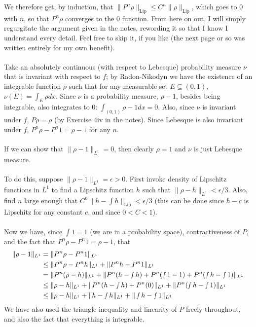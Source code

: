 \documentclass[10pt,a4paper]{article}
\begin{document}
We therefore get, by induction, that $\|P^n\rho\|_{\text{Lip}}\leq C^n\|\rho\|_{\text{Lip}}$, which goes to 0 with $n$, so that $P^n\rho$ converges to the 0 function. From here on out, I will simply regurgitate the argument given in the notes, rewording it so that I know I understand every detail. Feel free to skip it, if you like (the next page or so was written entirely for my own benefit).\\\\
Take an absolutely continuous (with respect to Lebesque) probability measure $\nu$ that is invariant with respect to $f$; by Radon-Nikodyn we have the existence of an integrable function $\rho$ such that for any measurable set $E\subseteq(0,1)$, $\nu(E)=\int_E \rho dx$. Since $\nu$ is a probability measure, $\rho-1$, besides being integrable, also integrates to 0: $\int_{(0,1)}\rho-1dx=0$. Also, since $\nu$ is invariant under $f$, $P\rho=\rho$ (by Exercise 4iv in the notes). Since Lebesque is also invariant under $f$, $P^n\rho-P^n1=\rho-1$ for any $n$.\\\\
If we can show that $\|\rho-1\|_{L^1}=0$, then clearly $\rho=1$ and $\nu$ is just Lebesque measure.\\\\
To do this, suppose $\|\rho-1\|_{L^1}=\epsilon>0$. First invoke density of Lipschitz functions in $L^1$ to find a Lipschitz function $h$ such that $\|\rho-h\|_{L^1}<\epsilon/3$. Also, find $n$ large enough that $C^n\|h-\int h\|_{\text{Lip}}<\epsilon/3$ (this can be done since $h-c$ is Lipschitz for any constant $c$, and since $0<C<1$).\\\\
Now we have, since $\int1=1$ (we are in a probability space), contractiveness of $P$, and the fact that $P^n\rho-P^n1=\rho-1$, that
\begin{align*}\|\rho-1\|_{L^1}&=\|P^n\rho-P^n1\|_{L^1}\\
&\leq\|P^n\rho-P^nh\|_{L^1}+\|P^nh-P^n1\|_{L^1}\\
&=\|P^n(\rho-h)\|_{L^1}+\|P^n(h-\smallint h)+P^n(\smallint 1-1)+P^n(\smallint h-\smallint 1)\|_{L^1}\\
&\leq\|\rho-h\|_{L^1}+\|P^n(h-\smallint h)+P^n(0)\|_{L^1}+\|P^n(\smallint h-\smallint 1)\|_{L^1}\\
&\leq\|\rho-h\|_{L^1}+\|h-\smallint h\|_{L^1}+\|\smallint h-\smallint 1\|_{L^1}
\end{align*}
We have also used the triangle inequality and linearity of $P$ freely throughout, and also the fact that everything is integrable.\\\\
\end{document}
